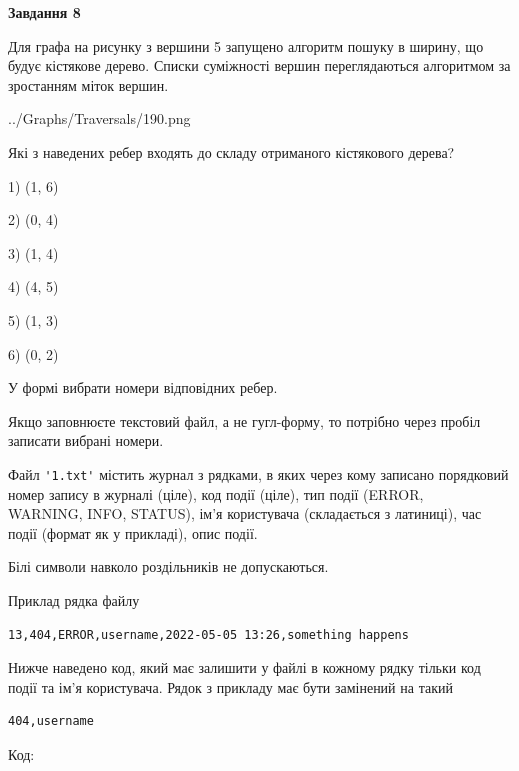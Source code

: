 \documentclass[12pt, ukrainian]{article}
\def\code#1{\Verb!#1!}
\begin{document}
{\begin {large}
{\begin {center}\textbf{Завдання 8}\end {center}}\par
Для графа на рисунку з вершини 5 запущено алгоритм пошуку в ширину, що будує кістякове дерево. Списки суміжності вершин переглядаються алгоритмом за зростанням міток вершин.\par
\begin{center}
	{../Graphs/Traversals/190.png}
\end{center}
\par Які з наведених ребер входять до складу отриманого кістякового дерева?\par
1) (1, 6)\par
2) (0, 4)\par
3) (1, 4)\par
4) (4, 5)\par
5) (1, 3)\par
6) (0, 2)\par
{\vskip 15pt} У формі вибрати номери відповідних ребер.


Якщо заповнюєте текстовий файл, а не гугл-форму, то потрібно через пробіл записа\-ти вибрані номери.\par
\newpage


Файл \code{'1.txt'} містить журнал з рядками, в яких через кому записано поряд\-ко\-вий номер запису в журналі (ціле), код події (ціле), тип події (ERROR, \\WARNING, INFO, STATUS), ім'я користувача (складається з латиниці), час події (фор\-мат як у прикладі), опис події.

Білі символи навколо роздільників не допускаються.

Приклад рядка файлу



\begin{verbatim}
13,404,ERROR,username,2022-05-05 13:26,something happens
\end{verbatim}


Нижче наведено код, який має залишити у файлі в кожному рядку тільки код події та ім'я користувача. Рядок з прикладу має бути замінений на такий



\begin{verbatim}
404,username
\end{verbatim}




Код:




\end{large}}
\end{document}
